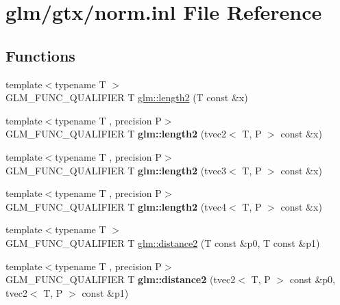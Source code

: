 \hypertarget{norm_8inl}{\section{glm/gtx/norm.inl File Reference}
\label{norm_8inl}
}
\subsection*{Functions}
\begin{DoxyCompactItemize}
\item 
{\footnotesize template$<$typename T $>$ }\\G\-L\-M\-\_\-\-F\-U\-N\-C\-\_\-\-Q\-U\-A\-L\-I\-F\-I\-E\-R T \hyperlink{group__gtx__norm_ga08c670024cd230e22f8b853f185ff533}{glm\-::length2} (T const \&x)
\item 
\hypertarget{namespaceglm_a875e151c20a62ae94040a751a54f3aa4}{{\footnotesize template$<$typename T , precision P$>$ }\\G\-L\-M\-\_\-\-F\-U\-N\-C\-\_\-\-Q\-U\-A\-L\-I\-F\-I\-E\-R T {\bfseries glm\-::length2} (tvec2$<$ T, P $>$ const \&x)}\label{namespaceglm_a875e151c20a62ae94040a751a54f3aa4}

\item 
\hypertarget{namespaceglm_a4cbd4c83d9779038e8f2ad4adc2020b8}{{\footnotesize template$<$typename T , precision P$>$ }\\G\-L\-M\-\_\-\-F\-U\-N\-C\-\_\-\-Q\-U\-A\-L\-I\-F\-I\-E\-R T {\bfseries glm\-::length2} (tvec3$<$ T, P $>$ const \&x)}\label{namespaceglm_a4cbd4c83d9779038e8f2ad4adc2020b8}

\item 
\hypertarget{namespaceglm_a7bdb6f10f4951764181793679d4f16a8}{{\footnotesize template$<$typename T , precision P$>$ }\\G\-L\-M\-\_\-\-F\-U\-N\-C\-\_\-\-Q\-U\-A\-L\-I\-F\-I\-E\-R T {\bfseries glm\-::length2} (tvec4$<$ T, P $>$ const \&x)}\label{namespaceglm_a7bdb6f10f4951764181793679d4f16a8}

\item 
{\footnotesize template$<$typename T $>$ }\\G\-L\-M\-\_\-\-F\-U\-N\-C\-\_\-\-Q\-U\-A\-L\-I\-F\-I\-E\-R T \hyperlink{group__gtx__norm_ga3544f6288d3bce2cf2a9f6ebe39e0557}{glm\-::distance2} (T const \&p0, T const \&p1)
\item 
\hypertarget{namespaceglm_a96912f40056fa526cc78cbed19ef2a78}{{\footnotesize template$<$typename T , precision P$>$ }\\G\-L\-M\-\_\-\-F\-U\-N\-C\-\_\-\-Q\-U\-A\-L\-I\-F\-I\-E\-R T {\bfseries glm\-::distance2} (tvec2$<$ T, P $>$ const \&p0, tvec2$<$ T, P $>$ const \&p1)}\label{namespaceglm_a96912f40056fa526cc78cbed19ef2a78}


\end{DoxyCompactItemize}
